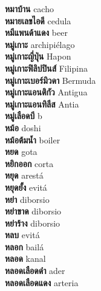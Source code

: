 \textbf{ หมาบ้าน  } cacho \\
\textbf{ หมายเลขไอดี  } cedula \\
\textbf{ หมีแพนด้าแดง  } beer \\
\textbf{ หมู่เกาะ  } archipiélago \\
\textbf{ หมู่เกาะญี่ปุ่น  } Hapon \\
\textbf{ หมู่เกาะฟิลิปปินส์  } Filipina \\
\textbf{ หมู่เกาะเบอร์มิวดา  } Bermuda \\
\textbf{ หมู่เกาะแอนติกัว  } Antigua \\
\textbf{ หมู่เกาะแอนทิลีส  } Antia \\
\textbf{ หมู่เลือดบี  } b \\
\textbf{ หม้อ  } doshi \\
\textbf{ หม้อต้มน้ำ  } boiler \\
\textbf{ หยด  } gota \\
\textbf{ หยิกออก  } corta \\
\textbf{ หยุด  } arestá \\
\textbf{ หยุดยั้ง  } evitá \\
\textbf{ หย่า  } diborsio \\
\textbf{ หย่าขาด  } diborsio \\
\textbf{ หย่าร้าง  } diborsio \\
\textbf{ หลบ  } evitá \\
\textbf{ หลอก  } bailá \\
\textbf{ หลอด  } kanal \\
\textbf{ หลอดเลือดดำ  } ader \\
\textbf{ หลอดเลือดแดง  } arteria \\
